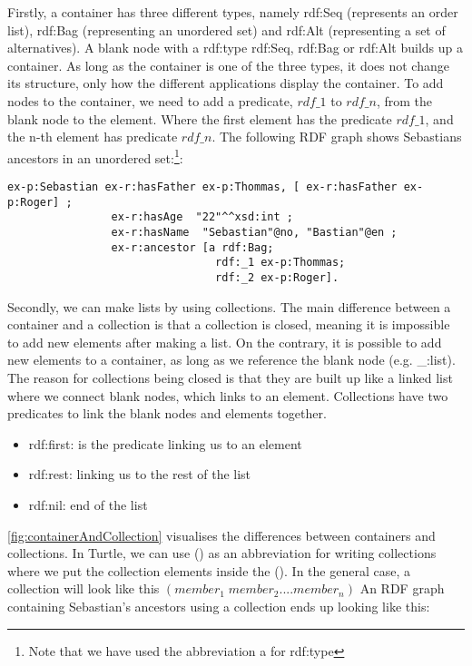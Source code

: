 \para
Firstly, a container has three different types, namely rdf:Seq (represents an order list), rdf:Bag (representing an unordered set) and rdf:Alt (representing a set of alternatives). A blank node with a rdf:type rdf:Seq, rdf:Bag or rdf:Alt builds up a container. As long as the container is one of the three types, it does not change its structure, only how the different applications display the container. To add nodes to the container, we need to add a predicate, $rdf\_1$ to $rdf\_n$, from the blank node to the element. Where the first element has the predicate $rdf\_1$, and the n-th element has predicate $rdf\_n$. The following RDF graph shows Sebastians ancestors in an unordered set:\footnote{Note that we have used the abbreviation a for rdf:type}:
\begin{lstlisting}[frame=single, language=turtle]
ex-p:Sebastian ex-r:hasFather ex-p:Thommas, [ ex-r:hasFather ex-p:Roger] ; 
                ex-r:hasAge  "22"^^xsd:int ; 
                ex-r:hasName  "Sebastian"@no, "Bastian"@en ;
                ex-r:ancestor [a rdf:Bag; 
                                rdf:_1 ex-p:Thommas; 
                                rdf:_2 ex-p:Roger].
\end{lstlisting}
Secondly, we can make lists by using collections. The main difference between a container and a collection is that a collection is closed, meaning it is impossible to add new elements after making a list. On the contrary, it is possible to add new elements to a container, as long as we reference the blank node (e.g. \_:list). The reason for collections being closed is that they are built up like a linked list where we connect blank nodes, which links to an element. Collections have two predicates to link the blank nodes and elements together. 

\begin{itemize}
    \item rdf:first: is the predicate linking us to an element
    \item rdf:rest: linking us to the rest of the list
    \item rdf:nil: end of the list
\end{itemize}
\autoref{fig:containerAndCollection} visualises the differences between containers and collections. In Turtle, we can use () as an abbreviation for writing collections where we put the collection elements inside the (). In the general case, a collection will look like this $(member_1 \;member_2 .... member_n)$ An RDF graph containing Sebastian's ancestors using a collection ends up looking like this:


